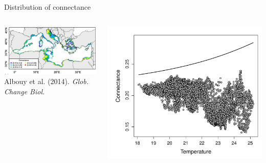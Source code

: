 \documentclass{eecslides}
\begin{document}
	\begin{frame}{Distribution of connectance}
 	    	\begin{columns}
			\begin{column}{0.5\textwidth}							
				\begin{center}
					\includegraphics[height=0.3\textheight]{med_connectance}\\
					\footnotesize{Albouy et al. (2014). \textit{Glob. Change Biol.}}
				\end{center}
			\end{column}
			\begin{column}{0.5\textwidth}
				\begin{center}
					\includegraphics[height=0.5\textheight]{ConnectanceTempSDM}\\
				\end{center}
			\end{column}				
		\end{columns}	   
	\end{frame}
\end{document}
